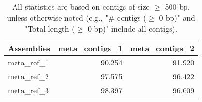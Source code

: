 \documentclass[12pt,a4paper]{article}
\begin{document}
\begin{table}[ht]
\begin{center}
\caption{All statistics are based on contigs of size $\geq$ 500 bp, unless otherwise noted (e.g., "\# contigs ($\geq$ 0 bp)" and "Total length ($\geq$ 0 bp)" include all contigs).}
\begin{tabular}{|l*{2}{|r}|}
\hline
Assemblies & meta\_contigs\_1 & meta\_contigs\_2 \\ \hline
meta\_ref\_1 & 90.254 & 91.920 \\ \hline
meta\_ref\_2 & 97.575 & 96.422 \\ \hline
meta\_ref\_3 & 98.397 & 96.609 \\ \hline
\end{tabular}
\end{center}
\end{table}
\end{document}
